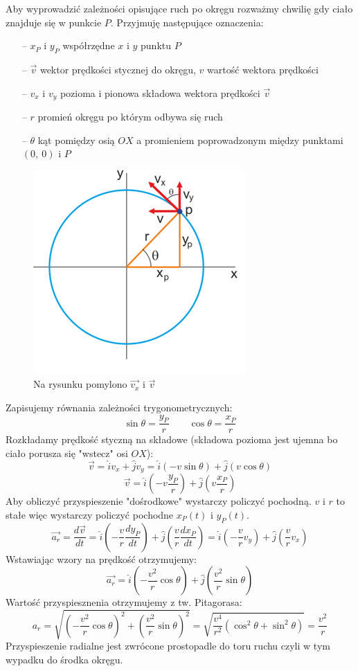 \documentclass[a4paper]{article}
\begin{document}
    Aby wyprowadzić zależności opisujące ruch po okręgu rozważmy chwilię
    gdy ciało znajduje się w punkcie $P$. Przyjmuję następujące oznaczenia:
    \begin{itemize}
        \item [--] $x_P$ i $y_P$ współrzędne $x$ i $y$ punktu $P$
        \item [--] $\vec{v}$ wektor prędkości stycznej do okręgu, $v$ wartość wektora prędkości
        \item [--] $v_x$ i $v_y$ pozioma i pionowa składowa wektora prędkości $\vec{v}$
        \item [--] $r$ promień okręgu po którym odbywa się ruch
        \item [--] $\theta$ kąt pomiędzy osią $OX$ a promieniem poprowadzonym między punktami $(0,\ 0)$ i $P$
    \end{itemize}
    \begin{figure}[H]
        \centering
        \includegraphics[]{img/ruchokrag.png}
        \caption{Na rysunku pomylono $\vec{v_x}$ i $\vec{v}$}
    \end{figure}
    Zapisujemy równania zależności trygonometrycznych:
    \[\sin\theta = \frac{y_P}{r} \quad\quad \cos\theta = \frac{x_P}{r}\]
    Rozkładamy prędkość styczną na składowe (składowa pozioma jest ujemna bo ciało porusza się "wstecz" osi $OX$):
    \[\vec{v} = \hat{i}v_x + \hat{j}v_y = \hat{i}(-v \sin\theta) + \hat{j}(v\cos\theta)\]
    \[\vec{v} = \hat{i}\left (-v \frac{y_P}{r} \right ) + \hat{j}\left (v \frac{x_P}{r} \right )\]    
    Aby obliczyć przyspieszenie "dośrodkowe" wystarczy policzyć pochodną. $v$ i $r$ to stałe więc wystarczy 
    policzyć pochodne $x_P(t)$ i $y_P(t)$.
    \[\vec{a_r} = \frac{d\vec{v}}{dt} =
    \hat{i}\left (-\frac{v}{r} \frac{dy_P}{dt} \right ) + \hat{j}\left (\frac{v}{r} \frac{dx_P}{dt} \right ) 
    = \hat{i}\left (-\frac{v}{r} v_y \right ) + \hat{j}\left (\frac{v}{r} v_x \right ) \]
    Wstawiając wzory na prędkość otrzymujemy:
    \[\vec{a_r} = \hat{i}\left (-\frac{v^2}{r} \cos\theta \right ) + \hat{j}\left (\frac{v^2}{r} \sin\theta \right )\]
    Wartość przyspiesznenia otrzymujemy z tw. Pitagorasa:
    \[a_r = \sqrt{\left (-\frac{v^2}{r} \cos\theta \right )^2 + \left (\frac{v^2}{r} \sin\theta \right )^2} = \sqrt{\frac{v^4}{r^2}(\cos^2\theta + \sin^2\theta)} = \frac{v^2}{r}\]
    Przyspieszenie radialne jest zwrócone prostopadle do toru ruchu czyli w tym wypadku do 
    środka okręgu. 
\end{document}
